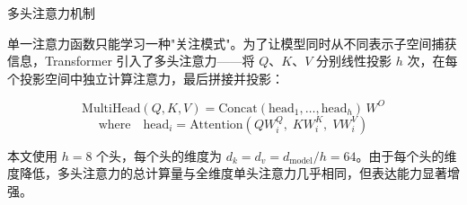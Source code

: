 \documentclass[10pt, aspectratio=169, noamsthm, t]{beamer}
\begin{document}
\begin{frame}{多头注意力机制}

单一注意力函数只能学习一种"关注模式"。为了让模型同时从\alert{不同表示子空间}捕获信息，Transformer 引入了多头注意力——将 $Q$、$K$、$V$ 分别线性投影 $h$ 次，在每个投影空间中独立计算注意力，最后拼接并投影：

\vskip0.25cm

\[
\text{MultiHead}(Q,K,V) = \text{Concat}(\text{head}_1, \ldots, \text{head}_h)\, W^O
\]
\[
\text{where}\quad \text{head}_i = \text{Attention}(Q W_i^Q,\; K W_i^K,\; V W_i^V)
\]

\vskip0.25cm

本文使用 $h{=}8$ 个头，每个头的维度为 $d_k = d_v = d_{\text{model}}/h = 64$。由于每个头的维度降低，多头注意力的总计算量与全维度单头注意力几乎相同，但\alert{表达能力}显著增强。
\end{frame}
\end{document}
